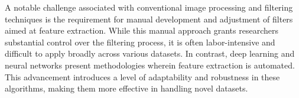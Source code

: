 A notable challenge associated with conventional image processing and filtering techniques is the requirement for manual development and adjustment of filters aimed at feature extraction.
While this manual approach grants researchers substantial control over the filtering process, it is often labor-intensive and difficult to apply broadly across various datasets.
In contrast, deep learning and neural networks present methodologies wherein feature extraction is automated.
This advancement introduces a level of adaptability and robustness in these algorithms, making them more effective in handling novel datasets.





